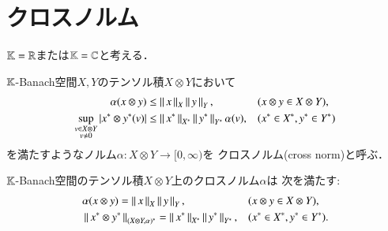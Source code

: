 \section{クロスノルム}
	$\mathbb{K} = \mathbb{R}$または$\mathbb{K}=\mathbb{C}$と考える．
	\begin{screen}
		\begin{dfn}[クロスノルム]
			$\mathbb{K}$-Banach空間$X,Y$のテンソル積$X \otimes Y$において
			\begin{align}
				\alpha(x \otimes y) &\leq \left\|\, x\, \right\|_{X} \left\|\, y\, \right\|_{Y}, && (x \otimes y \in X \otimes Y), \\
				\operatorname*{sup}_{\substack{v \in X \otimes Y \\ v \neq 0}} \left| x^* \otimes y^* (v) \right| &\leq \left\|\, x^*\, \right\|_{X^*} \left\|\, y^*\, \right\|_{Y^*}\alpha(v),
				&& (x^* \in X^*, y^* \in Y^*)
			\end{align}
			を満たすようなノルム$\alpha:X \otimes Y \longrightarrow [0,\infty)$を
			クロスノルム(cross norm)と呼ぶ．
		\end{dfn}
	\end{screen}
	
	\begin{screen}
		\begin{thm}
			$\mathbb{K}$-Banach空間のテンソル積$X \otimes Y$上のクロスノルム$\alpha$は
			次を満たす:
			\begin{align}
				&\alpha(x \otimes y) = \left\|\, x\, \right\|_{X} \left\|\, y\, \right\|_{Y}, && (x \otimes y \in X \otimes Y), \\
				&\left\|\, x^* \otimes y^*\, \right\|_{(X \otimes Y, \alpha)^*} = \left\|\, x^*\, \right\|_{X^*} \left\|\, y^*\, \right\|_{Y^*},
				&& (x^* \in X^*, y^* \in Y^*).
			\end{align}
		\end{thm}
	\end{screen}
	
